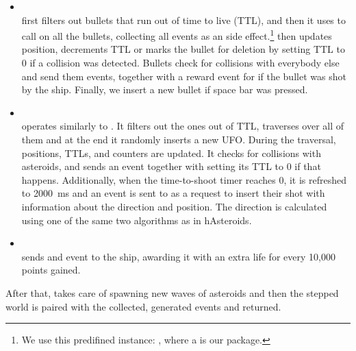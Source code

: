 \documentclass[
  digital, %
  color,   %
  table,   %
  oneside, %
  lof,     %
  lot,     %
]{fithesis3}
\begin{document}
{\begin{itemize}[--]
    \item {}\\
    first filters out bullets that run out of time to live (TTL), and then it uses 
    to call  on all the bullets, collecting all events as an
     side effect.\footnote{
    We use this predifined instance: ,
    where a is our  package.}
     then updates position, decrements TTL or marks the bullet for
    deletion by setting TTL to 0 if a collision was detected. Bullets check for collisions
    with everybody else and send them events, together with a reward event for 
    if the bullet was shot by the ship.
    Finally, we insert a new bullet if space bar was pressed.

    \item {}\\
    operates similarly to . It filters out the ones out of TTL,
    traverses over all of them and at the end it randomly inserts a new UFO.
    During the traversal, positions, TTLs, and  counters are updated.
    It checks for collisions with asteroids, and sends an event together with setting its TTL
    to 0 if that happens. Additionally, when the time-to-shoot timer reaches 0, it is refreshed
    to 2000~ms and an event is sent to  as a request to insert their shot
    with information about the direction and position. The direction is calculated using
    one of the same two algorithms as in hAsteroids.

    \item {}\\
    sends and event to the ship, awarding it with an extra life for every 10,000 points gained.
\end{itemize}
After that,  takes care of spawning new waves of asteroids
and then the stepped world is paired with the collected, generated events and returned.

}
\end{document}
